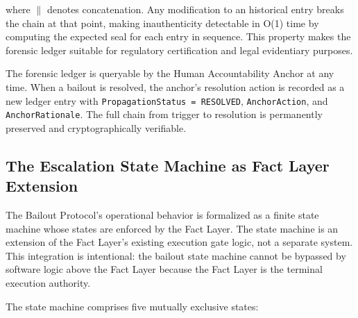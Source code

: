 where $\parallel$ denotes concatenation. Any modification to an historical entry breaks the chain at that point, making inauthenticity detectable in O(1) time by computing the expected seal for each entry in sequence. This property makes the forensic ledger suitable for regulatory certification and legal evidentiary purposes.

The forensic ledger is queryable by the Human Accountability Anchor at any time. When a bailout is resolved, the anchor's resolution action is recorded as a new ledger entry with \texttt{PropagationStatus = RESOLVED}, \texttt{AnchorAction}, and \texttt{AnchorRationale}. The full chain from trigger to resolution is permanently preserved and cryptographically verifiable.

\subsection{The Escalation State Machine as Fact Layer Extension}

The Bailout Protocol's operational behavior is formalized as a finite state machine whose states are enforced by the Fact Layer. The state machine is an extension of the Fact Layer's existing execution gate logic, not a separate system. This integration is intentional: the bailout state machine cannot be bypassed by software logic above the Fact Layer because the Fact Layer is the terminal execution authority.

The state machine comprises five mutually exclusive states:


